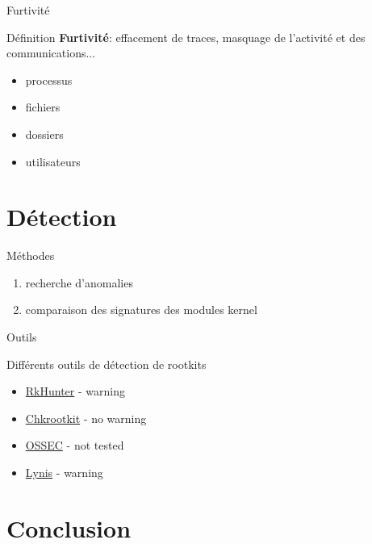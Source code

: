 \documentclass[10pt]{beamer}
\begin{document}
\begin{frame}{Furtivité}
	
	\begin{alertblock}{Définition}
		\textbf{Furtivité}:  effacement de traces, masquage de l'activité et des communications...
    \end{alertblock}
	\begin{itemize}
		\item processus
		\item fichiers
		\item dossiers
		\item utilisateurs
	\end{itemize}	 

\end{frame}


\section{Détection}

\begin{frame}{Méthodes}
	
	\begin{enumerate}
		\item recherche d'anomalies
		\item comparaison des signatures des modules kernel
	\end{enumerate}
	

\end{frame}

\begin{frame}{Outils}
	
	Différents outils de détection de rootkits
	\begin{itemize}
		\item \href{http://rkhunter.sourceforge.net/}{RkHunter} - \alert{warning}
		\item \href{http://www.chkrootkit.org/}{Chkrootkit} - {\color[rgb]{0,0.8,0.3} no warning}
		\item \href{http://ossec.github.io/}{OSSEC}   - {\color{gray} not tested}
		\item \href{https://cisofy.com/lynis/}{Lynis} - \alert{warning}
	\end{itemize}
	
\end{frame}


\section*{Conclusion}
\end{document}

